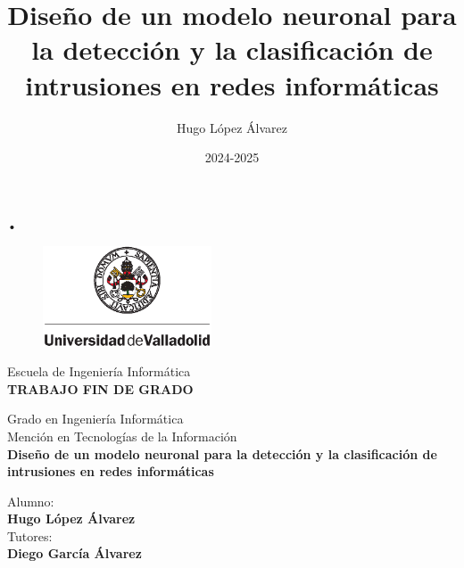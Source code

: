 \documentclass[openright,twoside,10pt]{book}
\date{2024-2025}
\author{Hugo López Álvarez}
\title{Diseño de un modelo neuronal para la detección y la clasificación de intrusiones en redes informáticas}
\begin{document}
\begin{titlepage}

\begin{center}
\vspace*{-0.5in}\textsc{•}
\begin{figure}[htb]
\begin{center}
\includegraphics[width=5cm]{./img/uva}
\end{center}
\end{figure}

\vspace*{0.3in}
\huge
{\selectfont Escuela de Ingeniería Informática}
\\
\vspace*{0.5in}
\large
{\selectfont \textbf{\textsc{\textsc{TRABAJO FIN DE GRADO}}}}


\vspace*{0.2in}
\selectfont Grado en Ingeniería Informática\\
\selectfont Mención en Tecnologías de la Información\\
\vspace*{0.8in}
\huge
{\selectfont\textbf{Diseño de un modelo neuronal para la detección y la clasificación de intrusiones en redes informáticas}}
\vspace*{1in}
\begin{large}
\begin{flushright}
Alumno:\\\textbf{Hugo López Álvarez}\\
\vspace*{0.3in}
Tutores:\\ \textbf{Diego García Álvarez}\\
\end{flushright}
\end{large}
\end{center}

\end{titlepage}

\newpage
\mbox{}	
\thispagestyle{empty} %
\end{document}
